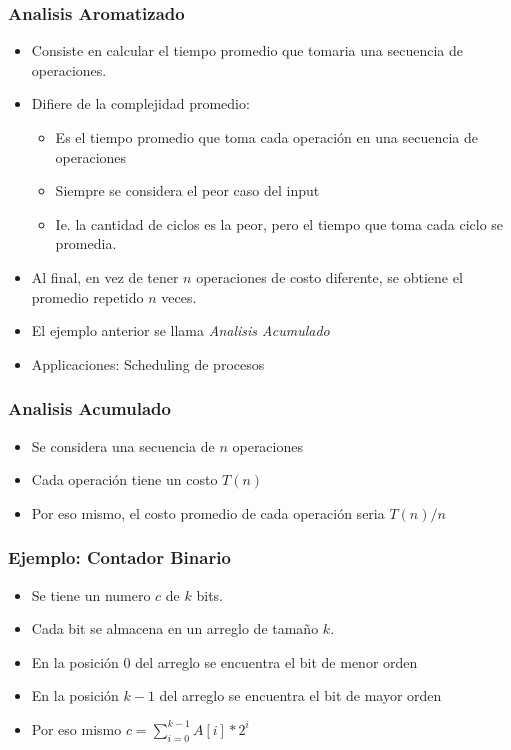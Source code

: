 \documentclass{beamer}
\begin{document}
\begin{frame}
    \frametitle{Analisis Aromatizado}
    \begin{itemize}
        \item{Consiste en calcular el tiempo promedio que tomaria una secuencia de operaciones.}
        \item{Difiere de la complejidad promedio:
        \begin{itemize}
            \item{Es el tiempo promedio que toma cada operaci\'on en una secuencia de
            operaciones}
            \item{Siempre se considera el peor caso del input}
            \item{Ie. la cantidad de ciclos es la peor, pero el tiempo que toma
            cada ciclo se promedia.}
        \end{itemize}
        }
        \item{Al final, en vez de tener $n$ operaciones de costo diferente,
        se obtiene el promedio repetido $n$ veces.}
        \item{El ejemplo anterior se llama \emph{Analisis Acumulado}}
        \item{Applicaciones: Scheduling de procesos}
    \end{itemize}
    \end{frame}
    
\begin{frame}
\frametitle{Analisis Acumulado}
\begin{itemize}
    \item{Se considera una secuencia de $n$ operaciones}
    \item{Cada operaci\'on tiene un costo $T(n)$}
    \item{Por eso mismo, el costo promedio de cada operaci\'on
    seria $T(n)/n$}
\end{itemize}
\end{frame}

\begin{frame}
\frametitle{Ejemplo: Contador Binario}
\begin{itemize}
    \item{Se tiene un numero $c$ de $k$ bits.}
    \item{Cada bit se almacena en un arreglo de tama\~no $k$.}
    \item{En la posici\'on $0$ del arreglo se encuentra el bit de
    menor orden}
    \item{En la posici\'on $k-1$ del arreglo se encuentra el bit de
    mayor orden}
    \item{Por eso mismo $c=\sum_{i=0}^{k-1}A[i]*2^i$}
\end{itemize}
\end{frame}
\end{document}
